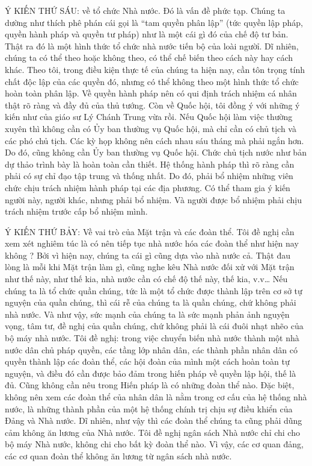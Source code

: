 Ý KIẾN THỨ SÁU: về tổ chức Nhà nước. Đó là vấn đề phức tạp. Chúng ta dường như thích phê phán cái gọi là “tam quyền phân lập” (tức quyền lập pháp, quyền hành pháp và quyền tư pháp) như là một cái gì đó của chế độ tư bản. Thật ra đó là một hình thức tổ chức nhà nước tiến bộ của loài ngườỉ. Dĩ nhiên, chúng ta có thể theo hoặc không theo, có thể chế biến theo cách này hay cách khác. Theo tôi, trong điều kiện thực tế của chúng ta hiện nay, cần tôn trọng tính chất độc lập của các quyền đó, nhưng có thể không theo một hình thức tổ chức hoàn toàn phân lập. Về quyền hành pháp nên có qui định trách nhiệm cá nhân thật rõ ràng và đầy đủ của thủ tướng. Còn về Quốc hội, tôi đồng ý với những ý kiến như của giáo sư Lý Chánh Trung vừa rồi. Nếu Quốc hội làm việc thường xuyên thì không cần có Ủy ban thường vụ Quốc hội, mà chỉ cần có chủ tịch và các phó chủ tịch. Các kỳ họp không nên cách nhau sáu tháng mà phải ngắn hơn. Do đó, cũng không cần Ủy ban thường vụ Quốc hội. Chức chủ tịch nước như bản dự thảo trình bày là hoàn toàn cần thiết. Hệ thống hành pháp thì rõ ràng cần phải có sự chỉ đạo tập trung và thống nhất. Do đó, phải bổ nhiệm những viên chức chịu trách nhiệm hành pháp tại các địa phương. Có thể tham gia ý kiến người này, người khác, nhưng phải bổ nhiệm. Và người được bổ nhiệm phải chịu trách nhiệm trước cấp bổ nhiệm mình.

Ý KIẾN THỨ BẢY: Về vai trò của Mặt trận và các đoàn thể. Tôi đề nghị cần xem xét nghiêm túc là có nên tiếp tục nhà nước hóa các đoàn thể như hiện nay không ? Bởi vì hiện nay, chúng ta cái gì cũng dựa vào nhà nước cả. Thật đau lòng là mỗi khi Mặt trận làm gì, cũng nghe kêu Nhà nước đối xử với Mặt trận như thế này, như thế kia, nhà nước cần có chế độ thế này, thế kia, v.v… Nếu chúng ta là tổ chức quần chúng, tức là một tổ chức được thành lập trên cơ sở tự nguyện của quần chúng, thì cái rễ của chúng ta là quần chúng, chứ không phải nhà nước. Và như vậy, sức mạnh của chúng ta là sức mạnh phản ảnh nguyện vọng, tâm tư, đề nghị của quần chúng, chứ không phải là cái đuôi nhạt nhẽo của bộ máy nhà nước. Tôi đề nghị: trong việc chuyển biến nhà nước thành một nhà nước dân chủ pháp quyền, các tầng lớp nhân dân, các thành phần nhân dân có quyền thành lập các đoàn thể, các hội đoàn của mình một cách hoàn toàn tự nguyện, và điều đó cần được bảo đảm trong hiến pháp về quyền lập hội, thế là đủ. Cũng không cần nêu trong Hiến pháp là có những đoàn thể nào. Đặc biệt, không nên xem các đoàn thể của nhân dân là nằm trong cơ cấu của hệ thống nhà nước, là những thành phần của một hệ thống chính trị chịu sự điều khiển của Đảng và Nhà nước. Dĩ nhiên, như vậy thì các đoàn thể chúng ta cũng phải dũng cảm không ăn lương của Nhà nước. Tôi đề nghị ngân sách Nhà nước chỉ chi cho bộ máy Nhà nước, không chi cho bất kỳ đoàn thể nào. Vì vậy, các cơ quan đảng, các cơ quan đoàn thể không ăn lương từ ngân sách nhà nước.

